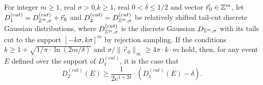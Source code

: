 \begin{lemma} \label{le:Renyi} For integer $m \geq 1$, real
  $\sigma>0$,$k \geq 1$, real $0<\delta \leq 1/2$ and vector
  $\vec{r}_0 \in \mathbb{Z}^m$, let
  $D_1^{(cut)} = D_{\mathbb{Z}^m,\sigma}^{(cut)} + \vec{r}_0$ and
  $D_2^{(cut)} = D_{\mathbb{Z}^m,\sigma}^{(cut)}$ be relatively shifted tail-cut
  discrete Gaussian distributions, where $D_{\mathbb{Z}^m,\sigma}^{(cut)}$ is the
  discrete Gaussian $D_{\mathbb{Z}^m,\sigma}$ with its tails cut to the support
  $[-k\sigma,k\sigma]^m$ by rejection sampling. If the conditions
  $k \geq 1 + \sqrt{1/\pi \cdot \ln(2m/\delta)}$ and
  $\sigma/\|\vec{r}_0\|_{\infty} \geq 4 \pi \cdot k \cdot m$ hold, then, for any
  event $E$ defined over the support of $D_1^{(cut)}$, it is the case that
$$
D_2^{(cut)}(E) \geq \frac{1}{2e^{1+2\delta}} \cdot \left(D_1^{(cut)}(E) - \delta\right).
$$
\end{lemma}

